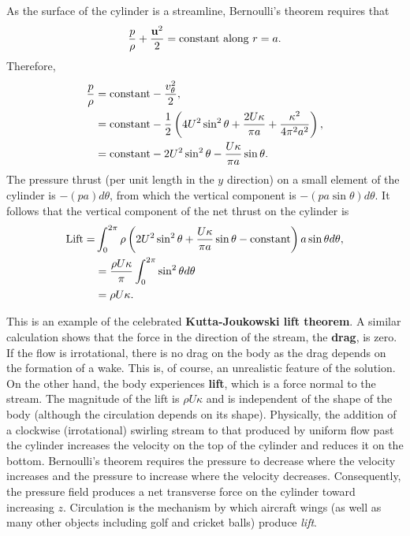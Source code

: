 \documentclass[twoside,a4paper,11pt]{report}
\begin{document}
As the surface of the cylinder is a streamline, Bernoulli's theorem requires 
that
\[
\frac{p}{\rho }+\frac{{{\bf u}}^2}{2}=\hbox{constant along } r=a.
\]
Therefore, 
\begin{align*}
\frac{p}{\rho } & = \hbox{constant}-\frac{v_\theta ^2 }{2}, \\
& =\hbox{constant} -\frac{1}{2}\left( {4U^2\sin ^2\theta +\frac{2U\kappa }{\pi 
a}+\frac{\kappa ^2}{4\pi ^2a^2}} \right), \\ 
& =\hbox{constant} -2U^2\sin ^2\theta -\frac{U\kappa }{\pi a}\sin \theta .
\end{align*}
The pressure thrust (per unit length in the $y$ direction) on a small element 
of the cylinder is $-\left( {pa} \right)d\theta $, from which the vertical 
component is $-\left( {pa\sin \theta } \right)d\theta $. 
It follows that the vertical component of the net thrust on the cylinder is
\begin{align*}
\hbox{Lift} = & \int_0^{2\pi } \rho \left( {2U^2\sin ^2\theta +\frac{U\kappa }{\pi 
a}\sin \theta -\hbox{constant}} \right)a\sin \theta d\theta , \\
& =\frac{\rho U\kappa }{\pi }\int_0^{2\pi } {\sin ^2\theta } d\theta  \\
& =\rho U\kappa.
\end{align*}

This is an example of the celebrated \textbf{Kutta-Joukowski lift theorem}. 
A similar calculation shows that the force in the direction of the stream, 
the \textbf{drag}, is zero. If the flow is irrotational, there is no drag on 
the body as the drag depends on the formation of a wake. This is, of course, 
an unrealistic feature of the solution. On the other hand, the body 
experiences \textbf{lift}, which is a force normal to the stream. The 
magnitude of the lift is $\rho U\kappa $ and is independent of the shape 
of the body (although the circulation depends on its shape). Physically, the 
addition of a clockwise (irrotational) swirling stream to that produced by 
uniform flow past the cylinder increases the velocity on the top of the 
cylinder and reduces it on the bottom. Bernoulli's theorem requires the 
pressure to decrease where the velocity increases and the pressure to 
increase where the velocity decreases. Consequently, the pressure field 
 produces a net transverse force on the 
cylinder toward increasing $z$. Circulation is the mechanism by which aircraft 
wings (as well as many other objects including golf and cricket balls) 
produce \textit{lift}. 
\end{document}
